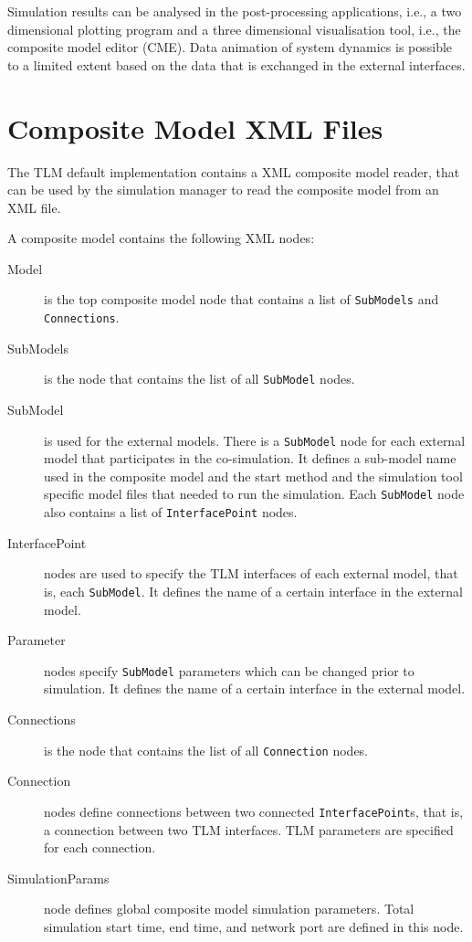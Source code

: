 Simulation results can be analysed in the post-processing applications, i.e., a two dimensional plotting program and a three dimensional visualisation tool, i.e., the composite model editor (CME). 
Data animation of system dynamics is possible to a limited extent based on the data that is exchanged in the external interfaces.

\section{Composite Model XML Files}
\label{meta}
The TLM default implementation contains a XML composite model reader, that can be used by the simulation manager to read the composite model from an XML file.

A composite model contains the following XML nodes:
\begin{description}
\item[Model] is the top composite model node that contains a list of {\tt SubModels} and {\tt Connections}.
\item[SubModels] is the node that contains the list of all {\tt SubModel} nodes.
\item[SubModel] is used for the external models. There is a {\tt SubModel} node for each external model that participates in the co-simulation. 
It defines a sub-model name used in the composite model and the start method and the simulation tool specific model files that needed to run the simulation. 
Each {\tt SubModel} node also contains a list of {\tt InterfacePoint} nodes.
\item[InterfacePoint] nodes are used to specify the TLM interfaces of each external model, that is, each {\tt SubModel}. 
It defines the name of a certain interface in the external model.
\item[Parameter] nodes specify {\tt SubModel} parameters which can be changed prior to simulation.
It defines the name of a certain interface in the external model.
\item[Connections] is the node that contains the list of all {\tt Connection} nodes.
\item[Connection] nodes define connections between two connected {\tt InterfacePoint}s, that is, a connection between two TLM interfaces. 
TLM parameters are specified for each connection.
\item[SimulationParams] node defines global composite model simulation parameters. 
Total simulation start time, end time, and network port  are defined in this node.
\end{description}



